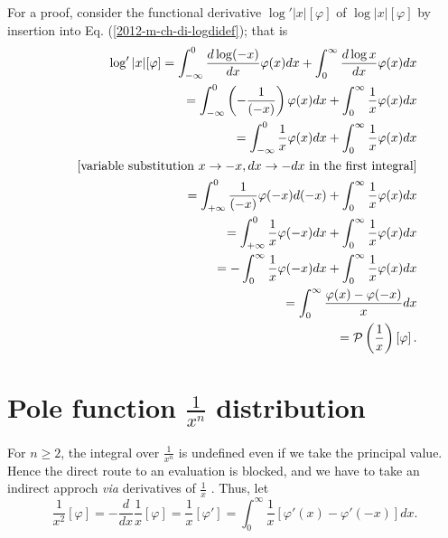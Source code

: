 {\color{OliveGreen}
\bproof

For a proof, consider the functional derivative
$\log' \vert x\vert [\varphi ]$
of $\log \vert x\vert [\varphi ]$ by insertion into Eq. (\ref{2012-m-ch-di-logdidef}); that is
\begin{equation}
\begin{split}
\log' \vert x\vert [\varphi ]
=
\int_{-\infty}^0 \frac{d\log (-x)}{dx}   \varphi(x) dx
+
\int_{0}^\infty   \frac{d\log  x }{dx}    \varphi(x) dx
\\
\qquad
=
\int_{-\infty}^0 \left(-\frac{1}{(-x)}\right)   \varphi(x) dx
+
\int_{0}^\infty    \frac{1}{x}     \varphi(x) dx
\\
\qquad
=
\int_{-\infty}^0  \frac{1}{x}  \varphi(x) dx
+
\int_{0}^\infty    \frac{1}{x}     \varphi(x) dx
\\
\qquad
[\textrm{variable substitution }x\rightarrow -x, dx \rightarrow -dx \textrm{ in the first integral}]
\\
\qquad
=
\int_{+\infty}^0   \frac{1}{(-x)}     \varphi(-x) d(-x)
+
\int_{0}^\infty    \frac{1}{x}   \varphi(x) dx
\\
\qquad
=
\int_{+\infty}^0   \frac{1}{x}    \varphi(-x) dx
+
\int_{0}^\infty    \frac{1}{x}  \varphi(x) dx
\\
\qquad
=
-\int_0^{\infty}   \frac{1}{x}   \varphi(-x) dx
+
\int_{0}^\infty    \frac{1}{x}    \varphi(x) dx
\\
\qquad
=
\int_0^{\infty}   \frac{ \varphi(x) - \varphi(-x)}{x}  dx
\\
\qquad =
{\cal P} \left(\frac{1}{x}\right) \left[\varphi\right]
.
\end{split}
\end{equation}



\eproof
}


\section{Pole function $\frac{1}{x^n}$ distribution}

For $n\ge 2$, the integral over $\frac{1}{x^n}$ is undefined even if we take the principal value.
Hence the direct route to an evaluation is blocked, and we have to take an indirect approch {\it via}
derivatives of $\frac{1}{x}$ \cite{sommer-di}.
Thus, let
\begin{equation}
\frac{1}{x^2} \left[ \varphi \right]
=
-\frac{d}{dx} \frac{1}{x} \left[ \varphi \right]
=\frac{1}{x} \left[ \varphi ' \right] =
\int_0^{\infty}  \frac{1}{x}  \left[  \varphi'(x)
-
   \varphi'(-x) \right] dx
 .
\end{equation}

